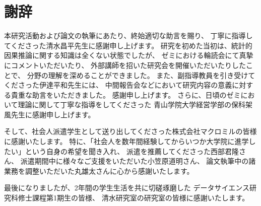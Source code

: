 %
\section*{謝辞}
%
本研究活動および論文の執筆にあたり、終始適切な助言を賜り、
丁寧に指導してくださった清水昌平先生に感謝申し上げます。
研究を初めた当初は、統計的因果推論に関する知識は全くない状態でしたが、
ゼミにおける輪読会にて真摯にコメントいただいたり、
外部講師を招いた研究会を開催いただいたりしたことで、
分野の理解を深めることができました。
また、副指導教員を引き受けてくださった伊達平和先生には、
中間報告会などにおいて研究内容の意義に対する貴重な助言をいただきました。
感謝申し上げます。
さらに、日頃のゼミにおいて理論に関して丁寧な指導をしてくださった
青山学院大学経営学部の保科架風先生に感謝申し上げます。

そして、社会人派遣学生として送り出してくださった株式会社マクロミルの皆様に感謝いたします。
特に、「社会人を数年間経験してからいつか大学院に進学したい」という自身の希望を聞き入れ、
派遣を推薦してくださった西部君隆さん、
派遣期間中に様々なご支援をいただいた小笠原道明さん、
論文執筆中の諸業務を調整いただいた丸雄太さんに心から感謝いたします。

最後になりましたが、2年間の学生生活を共に切磋琢磨した
データサイエンス研究科修士課程第1期生の皆様、
清水研究室の研究室の皆様に感謝いたします。
